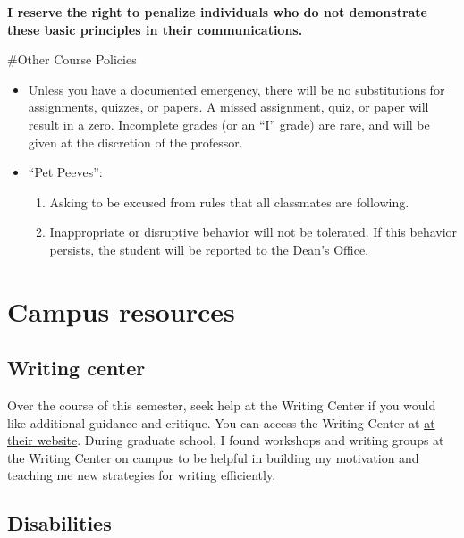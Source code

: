 \documentclass[11pt,]{article}
\providecommand{\tightlist}{%
  \setlength{\itemsep}{0pt}\setlength{\parskip}{0pt}}
\begin{document}
\textbf{I reserve the right to penalize individuals who do not
demonstrate these basic principles in their communications.}

\#Other Course Policies

\begin{itemize}
\item
  Unless you have a documented emergency, there will be no substitutions
  for assignments, quizzes, or papers. A missed assignment, quiz, or
  paper will result in a zero. Incomplete grades (or an ``I'' grade) are
  rare, and will be given at the discretion of the professor.
\item
  ``Pet Peeves'':

  \begin{enumerate}
  \def\labelenumi{\arabic{enumi}.}
  \tightlist
  \item
    Asking to be excused from rules that all classmates are following.
  \item
    Inappropriate or disruptive behavior will not be tolerated. If this
    behavior persists, the student will be reported to the Dean's
    Office.
  \end{enumerate}
\end{itemize}

\newpage

\hypertarget{campus-resources}{%
\section{Campus resources}\label{campus-resources}}

\hypertarget{writing-center}{%
\subsection{Writing center}\label{writing-center}}

Over the course of this semester, seek help at the Writing Center if you
would like additional guidance and critique. You can access the Writing
Center at
\href{https://www.southalabama.edu/departments/academicsuccess/cae/how.it.works.html}{at
their website}. During graduate school, I found workshops and writing
groups at the Writing Center on campus to be helpful in building my
motivation and teaching me new strategies for writing efficiently.

\hypertarget{disabilities}{%
\subsection{Disabilities}\label{disabilities}}
\end{document}
